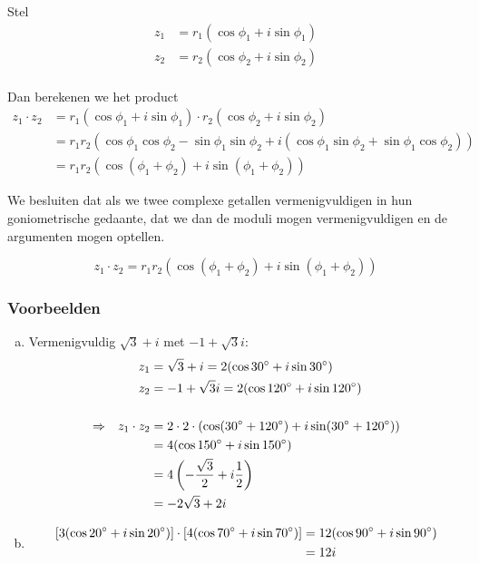 \documentclass[12pt,twoside,a4]{article}
\begin{document}
Stel
\begin{align*}
  z_1 &= r_1 ( \cos \phi_1 + i \sin \phi_1 )\\
  z_2 &= r_2 ( \cos \phi_2 + i \sin \phi_2 )\\
\end{align*}

Dan berekenen we het product
\begin{align*}
  z_1 \cdot z_2 &= r_1 ( \cos \phi_1 + i \sin \phi_1 ) \cdot r_2 ( \cos \phi_2 + i \sin \phi_2 )\\
            &= r_1 r_2 (\cos \phi_1 \cos \phi_2 - \sin \phi_1 \sin \phi_2 + i ( \cos \phi_1 \sin \phi_2 + \sin \phi_1 \cos \phi_2))\\
            &= r_1 r_2 (\cos (\phi_1 + \phi_2) + i \sin (\phi_1 + \phi_2))
\end{align*}

We besluiten dat als we twee complexe getallen vermenigvuldigen in hun goniometrische gedaante, dat we dan de moduli mogen vermenigvuldigen en de argumenten mogen optellen.\\

\begin{mdframed}
  \[
    z_1 \cdot z_2 = r_1 r_2 \left(\cos (\phi_1 + \phi_2) + i \sin (\phi_1 + \phi_2)\right)
  \]
\end{mdframed}

\subsubsection*{Voorbeelden}

\begin{enumerate}[(a)]
\item Vermenigvuldig $\sqrt{3} + i$ met $-1+\sqrt{3}i$:
  \begin{align*}
      &&       z_1 &= \sqrt{3} + i = 2(\cos 30^\circ + i\sin 30^\circ)\\
      &&       z_2 &= -1 + \sqrt{3}i = 2(\cos 120^\circ + i\sin 120^\circ)\\\\
    \Rightarrow && z_1 \cdot z_2 &= 2 \cdot 2 \cdot ( \cos( 30^\circ + 120^\circ ) + i\sin( 30^\circ + 120^\circ ) )\\
      &&           &= 4 (\cos 150^\circ + i\sin 150^\circ)\\
      &&           &= 4 \left( -\dfrac{\sqrt{3}}{2} + i \dfrac{1}{2} \right)\\
      &&           &= -2\sqrt{3} + 2i
  \end{align*}
\item
  \begin{align*}
    \left[3(\cos 20^\circ + i\sin 20^\circ)\right] \cdot \left[4(\cos 70^\circ + i\sin 70^\circ)\right]  &= 12 (\cos 90^\circ + i\sin 90^\circ)\\
                       &= 12i
  \end{align*}
\end{enumerate}
\end{document}
